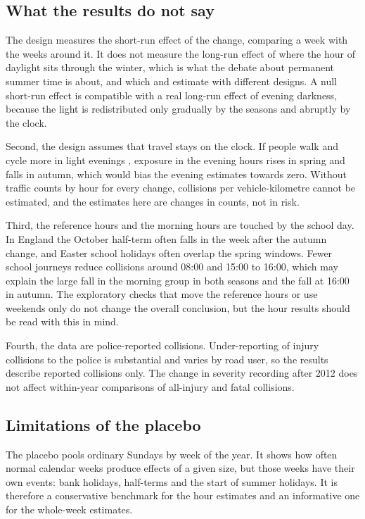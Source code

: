 \documentclass[11pt,a4paper]{article}
\begin{document}
\subsection{What the results do not say}
The design measures the short-run effect of the change, comparing a week with the weeks around it. It does not measure the long-run effect of where the hour of daylight sits through the winter, which is what the debate about permanent summer time is about, and which \citet{broughton1999} and \citet{bunnings2021} estimate with different designs. A null short-run effect is compatible with a real long-run effect of evening darkness, because the light is redistributed only gradually by the seasons and abruptly by the clock.

Second, the design assumes that travel stays on the clock. If people walk and cycle more in light evenings \citep{uttley2017jep}, exposure in the evening hours rises in spring and falls in autumn, which would bias the evening estimates towards zero. Without traffic counts by hour for every change, collisions per vehicle-kilometre cannot be estimated, and the estimates here are changes in counts, not in risk.

Third, the reference hours and the morning hours are touched by the school day. In England the October half-term often falls in the week after the autumn change, and Easter school holidays often overlap the spring windows. Fewer school journeys reduce collisions around 08:00 and 15:00 to 16:00, which may explain the large fall in the morning group in both seasons and the fall at 16:00 in autumn. The exploratory checks that move the reference hours or use weekends only do not change the overall conclusion, but the hour results should be read with this in mind.

Fourth, the data are police-reported collisions. Under-reporting of injury collisions to the police is substantial and varies by road user, so the results describe reported collisions only. The change in severity recording after 2012 does not affect within-year comparisons of all-injury and fatal collisions.

\subsection{Limitations of the placebo}
The placebo pools ordinary Sundays by week of the year. It shows how often normal calendar weeks produce effects of a given size, but those weeks have their own events: bank holidays, half-terms and the start of summer holidays. It is therefore a conservative benchmark for the hour estimates and an informative one for the whole-week estimates.
\end{document}
